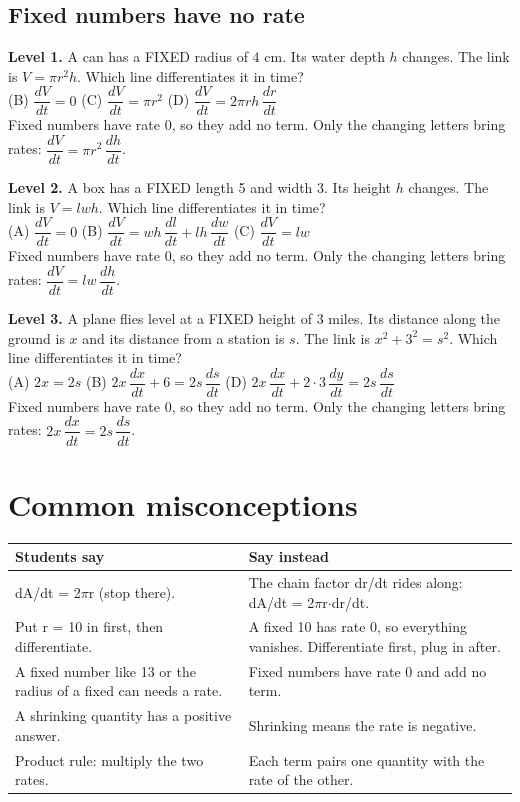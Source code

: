 \documentclass[11pt]{article}
\begin{document}
\subsection*{Fixed numbers have no rate}
\noindent\textbf{Level 1.} A can has a FIXED radius of 4 cm. Its water depth $h$ changes. The link is $V=\pi r^2h$. Which line differentiates it in time?\\  \quad (B) $\dfrac{dV}{dt}=0$ \quad (C) $\dfrac{dV}{dt}=\pi r^2$ \quad (D) $\dfrac{dV}{dt}=2\pi rh\,\dfrac{dr}{dt}$\\  \quad Fixed numbers have rate 0, so they add no term. Only the changing letters bring rates: $\dfrac{dV}{dt}=\pi r^2\,\dfrac{dh}{dt}$.\par\medskip
\noindent\textbf{Level 2.} A box has a FIXED length 5 and width 3. Its height $h$ changes. The link is $V=lwh$. Which line differentiates it in time?\\ (A) $\dfrac{dV}{dt}=0$ \quad (B) $\dfrac{dV}{dt}=w h\,\dfrac{dl}{dt}+l h\,\dfrac{dw}{dt}$ \quad (C) $\dfrac{dV}{dt}=lw$ \quad {}\\  \quad Fixed numbers have rate 0, so they add no term. Only the changing letters bring rates: $\dfrac{dV}{dt}=lw\,\dfrac{dh}{dt}$.\par\medskip
\noindent\textbf{Level 3.} A plane flies level at a FIXED height of 3 miles. Its distance along the ground is $x$ and its distance from a station is $s$. The link is $x^2+3^2=s^2$. Which line differentiates it in time?\\ (A) $2x=2s$ \quad (B) $2x\,\dfrac{dx}{dt}+6=2s\,\dfrac{ds}{dt}$ \quad {} \quad (D) $2x\,\dfrac{dx}{dt}+2\cdot3\,\dfrac{dy}{dt}=2s\,\dfrac{ds}{dt}$\\  \quad Fixed numbers have rate 0, so they add no term. Only the changing letters bring rates: $2x\,\dfrac{dx}{dt}=2s\,\dfrac{ds}{dt}$.\par\medskip
\section*{Common misconceptions}\begin{tabularx}{\textwidth}{@{}X X@{}}\toprule Students say & Say instead\\\midrule
dA/dt = 2$\pi$r (stop there). & The chain factor dr/dt rides along: dA/dt = 2$\pi$r$\cdot$dr/dt.\\
Put r = 10 in first, then differentiate. & A fixed 10 has rate 0, so everything vanishes. Differentiate first, plug in after.\\
A fixed number like 13 or the radius of a fixed can needs a rate. & Fixed numbers have rate 0 and add no term.\\
A shrinking quantity has a positive answer. & Shrinking means the rate is negative.\\
Product rule: multiply the two rates. & Each term pairs one quantity with the rate of the other.\\
\bottomrule\end{tabularx}
\end{document}
